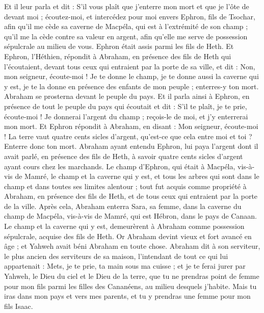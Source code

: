 \begin{multicols}{2}
Et il leur parla et dit : S'il vous plaît que j'enterre mon mort et que je l'ôte de devant moi ; écoutez-moi, et intercédez pour moi envers Ephron, fils de Tsochar,
afin qu'il me cède sa caverne de Macpéla, qui est à l'extrémité de son champ ; qu'il me la cède contre sa valeur en argent, afin qu'elle me serve de possession sépulcrale au milieu de vous.
Ephron était assis parmi les fils de Heth. Et Ephron, l'Héthien, répondit à Abraham, en présence des fils de Heth qui l'écoutaient, devant tous ceux qui entraient par la porte de sa ville, et dit :
Non, mon seigneur, écoute-moi ! Je te donne le champ, je te donne aussi la caverne qui y est, je te la donne en présence des enfants de mon peuple ; enterres-y ton mort.
Abraham se prosterna devant le peuple du pays.
Et il parla ainsi à Ephron, en présence de tout le peuple du pays qui écoutait et dit : S'il te plaît, je te prie, écoute-moi ! Je donnerai l'argent du champ ; reçois-le de moi, et j'y enterrerai mon mort.
Et Ephron répondit à Abraham, en disant :
Mon seigneur, écoute-moi ! La terre vaut quatre cents sicles d'argent, qu'est-ce que cela entre moi et toi ? Enterre donc ton mort.
Abraham ayant entendu Ephron, lui paya l'argent dont il avait parlé, en présence des fils de Heth, à savoir quatre cents sicles d'argent ayant cours chez les marchands.
Le champ d'Ephron, qui était à Macpéla, vis-à-vis de Mamré, le champ et la caverne qui y est, et tous les arbres qui sont dans le champ et dans toutes ses limites alentour ;
tout fut acquis comme propriété à Abraham, en présence des fils de Heth, et de tous ceux qui entraient par la porte de la ville.
Après cela, Abraham enterra Sara, sa femme, dans la caverne du champ de Macpéla, vis-à-vis de Mamré, qui est Hébron, dans le pays de Canaan.
Le champ et la caverne qui y est, demeurèrent à Abraham comme possession sépulcrale, acquise des fils de Heth.
\VerseOne{}Or Abraham devint vieux et fort avancé en âge ; et Yahweh avait béni Abraham en toute chose.
Abraham dit à son serviteur, le plus ancien des serviteurs de sa maison, l'intendant de tout ce qui lui appartenait : Mets, je te prie, ta main sous ma cuisse ;
et je te ferai jurer par Yahweh, le Dieu du ciel et le Dieu de la terre, que tu ne prendras point de femme pour mon fils parmi les filles des Cananéens, au milieu desquels j'habite.
Mais tu iras dans mon pays et vers mes parents, et tu y prendras une femme pour mon fils Isaac.

\end{multicols}
